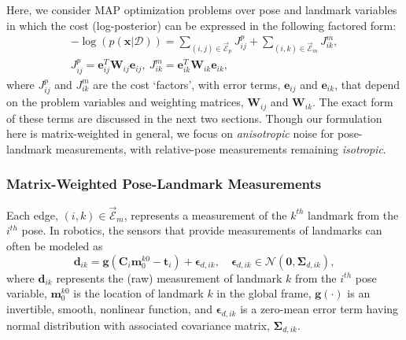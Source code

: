 \documentclass[lettersize,journal]{IEEEtran}
\newcommand{\EdgeSet}{\vec{\bm{\mathcal{E}}}}
\begin{document}
Here, we consider MAP optimization problems over pose and landmark variables in which the cost (log-posterior) can be expressed in the following factored form\cite{barfootStateEstimationRobotics2017}:
\begin{equation}\label{eqn:factor_graph}
	\begin{gathered}
		-\log\left(p(\bm{x} \vert \bm{\mathcal{D}})\right) = \sum\limits_{(i,j)\in\EdgeSet_p}  J_{ij}^{p} + \sum\limits_{(i,k)\in\EdgeSet_m} J_{ik}^{m}, \\ 
		J_{ij}^{p} = \bm{e}_{ij}^T \bm{W}_{ij} \bm{e}_{ij}, ~J_{ik}^{m} = \bm{e}_{ik}^T \bm{W}_{ik} \bm{e}_{ik},
	\end{gathered}
\end{equation}
where $J_{ij}^{p}$ and $J_{ik}^{m}$ are the cost `factors', with error terms, $\bm{e}_{ij}$ and $\bm{e}_{ik}$, that depend on the problem variables and weighting matrices, $\bm{W}_{ij}$ and $\bm{W}_{ik}$. 
The exact form of these terms are discussed in the next two sections. Though our formulation here is matrix-weighted in general, we focus on \emph{anisotropic} noise for pose-landmark measurements, with relative-pose measurements remaining \emph{isotropic}.

\subsubsection{Matrix-Weighted Pose-Landmark Measurements}\label{sec:LandmarkMeas}

Each edge, $(i,k) \in \EdgeSet_m $, represents a measurement of the $k^{th}$ landmark from the $i^{th}$ pose. In robotics, the sensors that provide measurements of landmarks can often be modeled as
\begin{equation}
	\bm{d}_{ik} = \bm{g}(\bm{C}_i\bm{m}_0^{k0} - \bm{t}_i) + \bm{\epsilon}_{d,ik}, \quad \bm{\epsilon}_{d,ik} \in \mathcal{N}(\bm{0},\bm{\Sigma}_{d,ik}),
\end{equation}
where $ \bm{d}_{ik} $ represents the (raw) measurement of landmark $k$ from the $i^{th}$ pose variable, $\bm{m}_0^{k0}$ is the location of landmark $k$ in the global frame, $ \bm{g}(\cdot) $ is an invertible, smooth, nonlinear function, and $ \bm{\epsilon}_{d,ik} $ is a zero-mean error term having normal distribution with associated covariance matrix, $ \bm{\Sigma}_{d,ik} $. 
\end{document}
